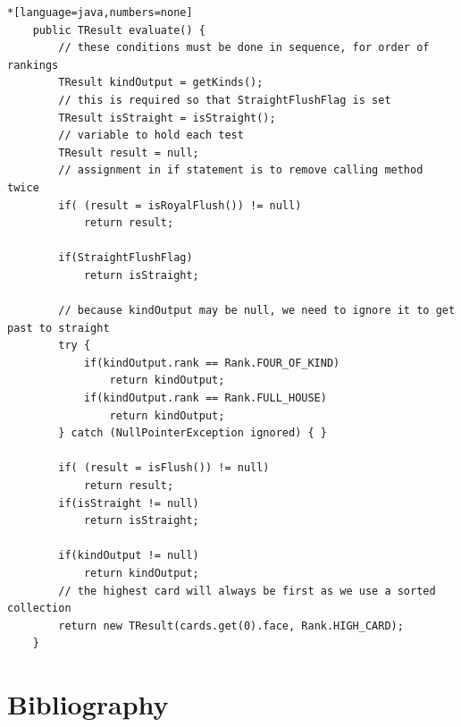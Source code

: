 \documentclass[11pt]{article}
\begin{document}
\begin{lstlisting}*[language=java,numbers=none]
    public TResult evaluate() {
        // these conditions must be done in sequence, for order of rankings
        TResult kindOutput = getKinds();
        // this is required so that StraightFlushFlag is set
        TResult isStraight = isStraight();
        // variable to hold each test
        TResult result = null;
        // assignment in if statement is to remove calling method twice
        if( (result = isRoyalFlush()) != null)
            return result;

        if(StraightFlushFlag)
            return isStraight;

        // because kindOutput may be null, we need to ignore it to get past to straight
        try {
            if(kindOutput.rank == Rank.FOUR_OF_KIND)
                return kindOutput;
            if(kindOutput.rank == Rank.FULL_HOUSE)
                return kindOutput;
        } catch (NullPointerException ignored) { }

        if( (result = isFlush()) != null)
            return result;
        if(isStraight != null)
            return isStraight;
       
        if(kindOutput != null)
            return kindOutput;
        // the highest card will always be first as we use a sorted collection
        return new TResult(cards.get(0).face, Rank.HIGH_CARD);
    }
\end{lstlisting}





\newpage
\section{Bibliography}
\end{document}
